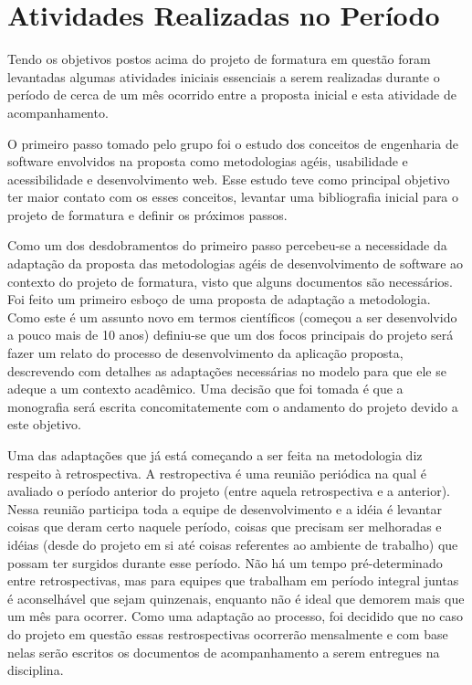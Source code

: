 \documentclass[a4paper,12pt,font=plain,header=plain]{abnt}
\begin{document}
  \section{Atividades Realizadas no Período}
	
	Tendo os objetivos postos acima do projeto de formatura em questão foram levantadas algumas atividades iniciais essenciais a serem realizadas durante o período de cerca de um mês ocorrido entre a proposta inicial e esta atividade de acompanhamento.
	
	O primeiro passo tomado pelo grupo foi o estudo dos conceitos de engenharia de software envolvidos na proposta como metodologias agéis, usabilidade e acessibilidade e desenvolvimento web. Esse estudo teve como principal objetivo ter maior contato com os esses conceitos, levantar uma bibliografia inicial para o projeto de formatura e definir os próximos passos.

	Como um dos desdobramentos do primeiro passo percebeu-se a necessidade da adaptação da proposta das metodologias agéis de desenvolvimento de software ao contexto do projeto de formatura, visto que alguns documentos são necessários. Foi feito um primeiro esboço de uma proposta de adaptação a metodologia. Como este é um assunto novo em termos científicos (começou a ser desenvolvido a pouco mais de 10 anos) definiu-se que um dos focos principais do projeto será fazer um relato do processo de desenvolvimento da aplicação proposta, descrevendo com detalhes as adaptações necessárias no modelo para que ele se adeque a um contexto acadêmico. Uma decisão que foi tomada é que a monografia será escrita concomitatemente com o andamento do projeto devido a este objetivo.
	
	Uma das adaptações que já está começando a ser feita na metodologia diz respeito à retrospectiva. A restropectiva é uma reunião periódica na qual é avaliado o período anterior do projeto (entre aquela retrospectiva e a anterior). Nessa reunião participa toda a equipe de desenvolvimento e a idéia é levantar coisas que deram certo naquele período, coisas que precisam ser melhoradas e idéias (desde do projeto em si até coisas referentes ao ambiente de trabalho) que possam ter surgidos durante esse período. Não há um tempo pré-determinado entre retrospectivas, mas para equipes que trabalham em período integral juntas é aconselhável que sejam quinzenais, enquanto não é ideal que demorem mais que um mês para ocorrer. Como uma adaptação ao processo, foi decidido que no caso do projeto em questão essas restrospectivas ocorrerão mensalmente e com base nelas serão escritos os documentos de acompanhamento a serem entregues na disciplina.
\end{document}
